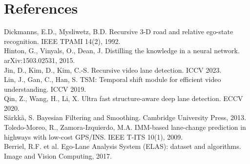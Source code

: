 \documentclass[10pt,a4paper]{article}
\theoremstyle{definition}
\begin{document}
\section*{References}
\small
Dickmanns, E.D., Mysliwetz, B.D. Recursive 3-D road and relative ego-state recognition. IEEE TPAMI 14(2), 1992.\\
Hinton, G., Vinyals, O., Dean, J. Distilling the knowledge in a neural network. arXiv:1503.02531, 2015.\\
Jin, D., Kim, D., Kim, C.-S. Recursive video lane detection. ICCV 2023.\\
Lin, J., Gan, C., Han, S. TSM: Temporal shift module for efficient video understanding. ICCV 2019.\\
Qin, Z., Wang, H., Li, X. Ultra fast structure-aware deep lane detection. ECCV 2020.\\
Särkkä, S. Bayesian Filtering and Smoothing. Cambridge University Press, 2013.\\
Toledo-Moreo, R., Zamora-Izquierdo, M.A. IMM-based lane-change prediction in highways with low-cost GPS/INS. IEEE
T-ITS 10(1), 2009.\\
Berriel, R.F. et al. Ego-Lane Analysis System (ELAS): dataset and algorithms. Image and Vision Computing, 2017.
\end{document}
